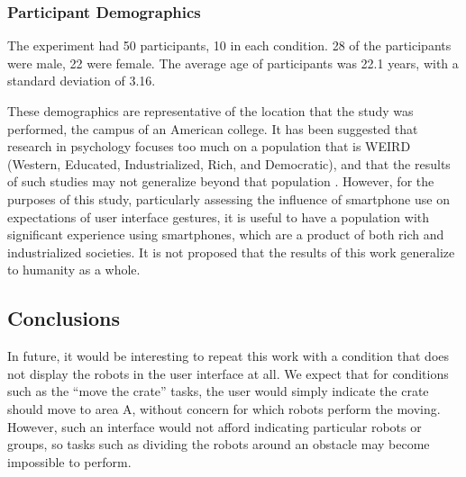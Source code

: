 


\subsubsection{Participant Demographics}

The experiment had 50 participants, 10 in each condition. 28 of the participants were male, 22 were female. The average age of participants was 22.1 years, with a standard deviation of 3.16. 

These demographics are representative of the location that the study was performed, the campus of an American college. 
It has been suggested that research in psychology focuses too much on a population that is WEIRD (Western, Educated, Industrialized, Rich, and Democratic), and that the results of such studies may not generalize beyond that population \citep{arnett2008neglected}.
However, for the purposes of this study, particularly assessing the influence of smartphone use on expectations of user interface gestures, it is useful to have a population with significant experience using smartphones, which are a product of both rich and industrialized societies. 
It is not proposed that the results of this work generalize to humanity as a whole.  

\subsection{Conclusions}

In future, it would be interesting to repeat this work with a condition that does not display the robots in the user interface at all. 
We expect that for conditions such as the ``move the crate'' tasks, the user would simply indicate the crate should move to area A, without concern for which robots perform the moving. 
However, such an interface would not afford indicating particular robots or groups, so tasks such as dividing the robots around an obstacle may become impossible to perform.

